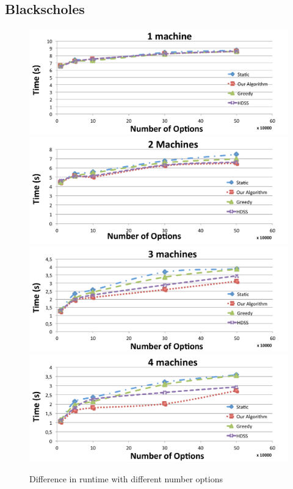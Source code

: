 \documentclass[journal]{IEEEtran}
\begin{document}
\subsection{Blackscholes}

\begin{figure}[htb]
	\begin{center}
	\centering
		\includegraphics[scale=0.3]{1machineBlack.pdf} \quad
		\includegraphics[scale=0.3]{2machineBlack.pdf} \quad
		\includegraphics[scale=0.3]{3machineBlack.pdf} \quad
		\includegraphics[scale=0.3]{4machineBlack.pdf} 
	\caption{Difference in runtime with different number options}
	\label{fig:black}
	\end{center}
\end{figure}
\end{document}
